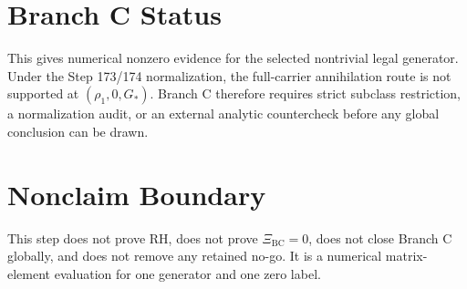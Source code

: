 \documentclass[11pt]{article}
\begin{document}
\section{Branch C Status}

This gives numerical nonzero evidence for the selected nontrivial legal
generator.  Under the Step 173/174 normalization, the full-carrier annihilation
route is not supported at \((\rho_1,0,G_*)\).  Branch C therefore requires
strict subclass restriction, a normalization audit, or an external analytic
countercheck before any global conclusion can be drawn.

\section{Nonclaim Boundary}

This step does not prove RH, does not prove \(\Xi_{\mathrm{BC}}=0\), does not
close Branch C globally, and does not remove any retained no-go.  It is a
numerical matrix-element evaluation for one generator and one zero label.
\end{document}
